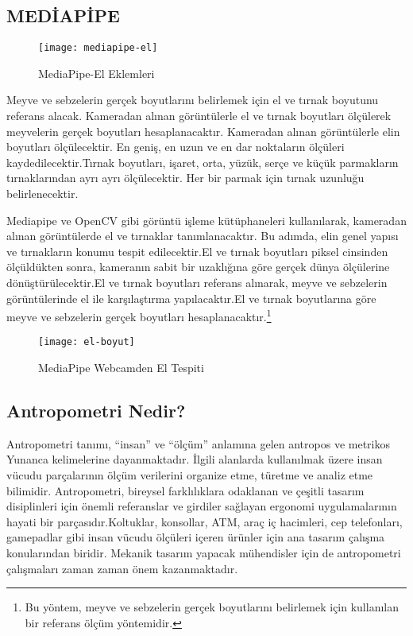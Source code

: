\documentclass[11pt,a4paper]{report}
\begin{document}
  \subsection{MEDİAPİPE}
  \begin{figure}[!h]
  	\centering
  	\texttt{[image: mediapipe-el]}
  	\caption{MediaPipe-El Eklemleri}
  
  \end{figure}
 \begin{justify}
 	 Meyve ve sebzelerin gerçek boyutlarını belirlemek için el ve tırnak boyutunu referans alacak. Kameradan alınan görüntülerle el ve tırnak boyutları ölçülerek meyvelerin gerçek boyutları hesaplanacaktır.
 	Kameradan alınan görüntülerle elin boyutları ölçülecektir. En geniş, en uzun ve en dar noktaların ölçüleri kaydedilecektir.Tırnak boyutları, işaret, orta, yüzük, serçe ve küçük parmakların tırnaklarından ayrı ayrı ölçülecektir. Her bir parmak için tırnak uzunluğu belirlenecektir.\newline
 	
 	Mediapipe ve OpenCV gibi görüntü işleme kütüphaneleri kullanılarak, kameradan alınan görüntülerde el ve tırnaklar tanımlanacaktır. Bu adımda, elin genel yapısı ve tırnakların konumu tespit edilecektir.El ve tırnak boyutları piksel cinsinden ölçüldükten sonra, kameranın sabit bir uzaklığına göre gerçek dünya ölçülerine dönüştürülecektir.El ve tırnak boyutları referans alınarak, meyve ve sebzelerin görüntülerinde el ile karşılaştırma yapılacaktır.El ve tırnak boyutlarına göre meyve ve sebzelerin gerçek boyutları hesaplanacaktır.\footnote{Bu yöntem, meyve ve sebzelerin gerçek boyutlarını belirlemek için kullanılan bir referans ölçüm yöntemidir.}
 	 \begin{figure}[!h]
 		\centering
 		\texttt{[image: el-boyut]}
 		\caption{MediaPipe Webcamden El Tespiti}
 		
 	\end{figure}
 	\clearpage
 	\subsection{Antropometri Nedir?}
 		Antropometri tanımı, “insan” ve “ölçüm” anlamına gelen antropos ve metrikos Yunanca kelimelerine dayanmaktadır. İlgili alanlarda kullanılmak üzere insan vücudu parçalarının ölçüm verilerini organize etme, türetme ve analiz etme bilimidir.
 		Antropometri, bireysel farklılıklara odaklanan ve çeşitli tasarım disiplinleri için önemli referanslar ve girdiler sağlayan ergonomi uygulamalarının hayati bir parçasıdır.Koltuklar, konsollar, ATM, araç iç hacimleri, cep telefonları, gamepadlar gibi insan vücudu ölçüleri içeren ürünler için ana tasarım çalışma konularından biridir. Mekanik tasarım yapacak mühendisler için de antropometri çalışmaları zaman zaman önem kazanmaktadır.\cite{antropometrinedir}
 		

\end{justify}
\end{document}
